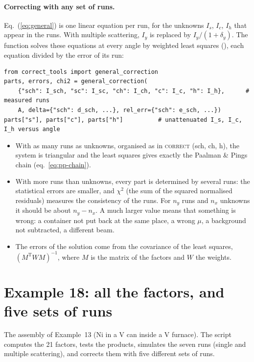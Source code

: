 \paragraph{Correcting with any set of runs.} Eq.~(\ref{eq:general}) is one linear equation per run, for the unknowns $I_s$, $I_c$,
$I_h$ that appear in the runs. With multiple scattering, $I_y$ is replaced by $I_y/(1+\delta_y)$. The function
 solves these equations at every angle by weighted least squares (), each equation
divided by the error of its run:
\begin{lstlisting}
from correct_tools import general_correction
parts, errors, chi2 = general_correction(
    {"sch": I_sch, "sc": I_sc, "ch": I_ch, "c": I_c, "h": I_h},      # measured runs
    A, delta={"sch": d_sch, ...}, rel_err={"sch": e_sch, ...})
parts["s"], parts["c"], parts["h"]          # unattenuated I_s, I_c, I_h versus angle
\end{lstlisting}
\begin{itemize}
  \item With as many runs as unknowns, organised as in \textsc{correct} (sch, ch, h), the system is triangular and the least squares
        gives exactly the Paalman \& Pings chain (eq.~\ref{eq:pp-chain}).
  \item With more runs than unknowns, every part is determined by several runs: the statistical errors are smaller, and
        $\chi^2$ (the sum of the squared normalised residuals) measures the consistency of the runs. For $n_y$ runs and $n_x$ unknowns
        it should be about $n_y-n_x$. A much larger value means that something is wrong: a container not put back at the same place,
        a wrong $\mu$, a background not subtracted, a different beam.
  \item The errors of the solution come from the covariance of the least squares, $(M^\mathrm{T}WM)^{-1}$, where $M$ is the matrix of
        the factors and $W$ the weights.
\end{itemize}

\section{Example 18: all the factors, and five sets of runs}

The assembly of Example~13 (Ni in a V can inside a V furnace). The script computes the 21 factors, tests the products, simulates the
seven runs (single and multiple scattering), and corrects them with five different sets of runs.

